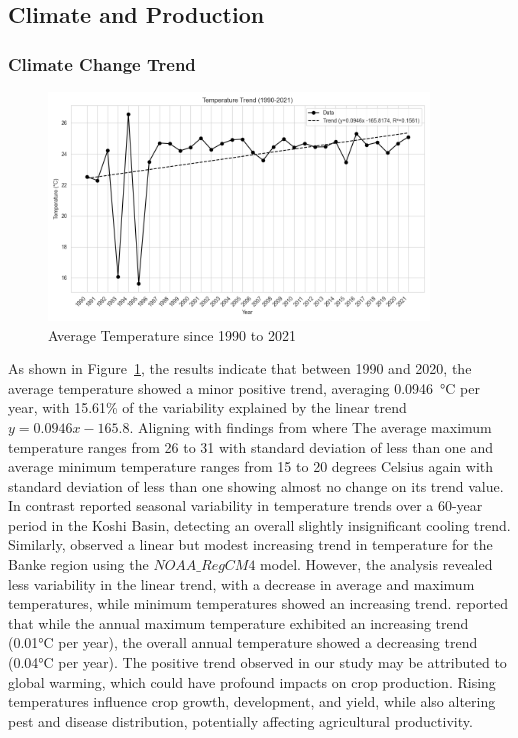 \subsection{Climate and Production}

\subsubsection{Climate Change Trend}
\begin{figure}[H]
    \centering
    \caption{Average Temperature since 1990 to 2021} 
    \label{fig:trend_avg_temp}
    \includegraphics[width=0.9\textwidth]{images/trend_avg_temp.png}
\end{figure}

As shown in Figure~\ref{fig:trend_avg_temp}, the results indicate that between 1990 and 2020, the average temperature showed a minor positive trend, averaging 0.0946~°C per year, with 15.61\% of the variability explained by the linear trend \( y = 0.0946x -165.8 \). Aligning with findings from \citet{regmiCropYieldResponse2019} where  The average maximum temperature ranges from 26 to 31 with standard deviation of less than one and average minimum temperature ranges from 15 to 20 degrees Celsius again with standard deviation of less than one showing almost no change on its trend value. In contrast  \citet{puriSpatialTemporalVariations2024} reported seasonal variability in temperature trends over a 60-year period in the Koshi Basin, detecting an overall slightly insignificant cooling trend. Similarly, \citet{risalImpactClimateChange2022} observed a linear but modest increasing trend in temperature for the Banke region using the $NOAA\_RegCM4$ model. However, the analysis revealed less variability in the linear trend, with a decrease in average and maximum temperatures, while minimum temperatures showed an increasing trend. \citet{dawadiImpactClimateChange2022} reported that while the annual maximum temperature exhibited an increasing trend (0.01°C per year), the overall annual temperature showed a decreasing trend (0.04°C per year).
The positive trend observed in our study may be attributed to global warming, which could have profound impacts on crop production. Rising temperatures influence crop growth, development, and yield, while also altering pest and disease distribution, potentially affecting agricultural productivity.

